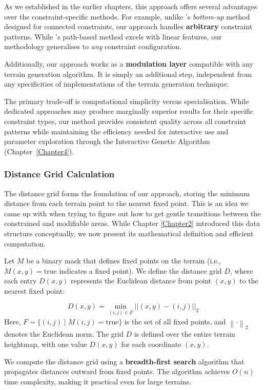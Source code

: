 As we established in the earlier chapters, this approach offers several advantages over the constraint-specific methods. For example, unlike \textcite{Belhadj07}'s \textit{bottom-up} method designed for connected constraints, our approach handles \textbf{arbitrary} constraint patterns. While \textcite{Andereck14}'s path-based method excels with linear features, our methodology generalises to \textit{any} constraint configuration. 

Additionally, our approach works as a \textbf{modulation layer} compatible with any terrain generation algorithm. It is simply an additional step, independent from any specificities of implementations of the terrain generation technique.

The primary trade-off is computational simplicity versus specialisation. While dedicated approaches may produce marginally superior results for their specific constraint types, our method provides consistent quality across all constraint patterns while maintaining the efficiency needed for interactive use and parameter exploration through the Interactive Genetic Algorithm (Chapter~\ref{Chapter4}).


\subsubsection{Distance Grid Calculation}
\label{distance_grid_calculation}

The distance grid forms the foundation of our approach, storing the minimum distance from each terrain point to the nearest fixed point. This is an idea we came up with when trying to figure out how to get gentle transitions between the constrained and modifiable areas. While Chapter \ref{Chapter2} introduced this data structure conceptually, we now present its mathematical definition and efficient computation.

Let $M$ be a binary mask that defines fixed points on the terrain (i.e., $M(x, y) = \text{true}$ indicates a fixed point). We define the distance grid $D$, where each entry $D(x, y)$ represents the Euclidean distance from point $(x, y)$ to the nearest fixed point:

\[D(x, y) = \min_{(i,j) \in F} || (x,y) - (i,j) ||_2 \]
Here, $F = \{(i,j) \mid M(i,j) = \text{true}\}$ is the set of all fixed points, and $\left\| \cdot \right\|_2$ denotes the Euclidean norm. The grid $D$ is defined over the entire terrain heightmap, with one value $D(x, y)$ for each coordinate $(x, y)$.

We compute the distance grid using a \textbf{breadth-first search} algorithm that propagates distances outward from fixed points. The algorithm achieves $O(n)$ time complexity, making it practical even for large terrains.

